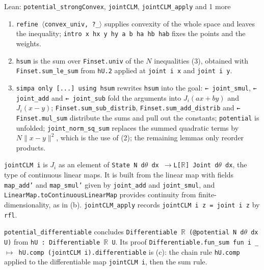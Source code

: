 \documentclass[11pt,a4paper]{report}
\begin{document}
\begin{leanbox}{Lean: \texttt{potential\_\allowbreak{}strongConvex}, \texttt{jointCLM}, \texttt{jointCLM\_\allowbreak{}apply} and 1 more}
\begin{enumerate}


\item \texttt{refine \ensuremath{\langle}convex\_\allowbreak{}univ, ?\_\allowbreak{}\ensuremath{\rangle}} supplies convexity of the whole space and leaves the inequality; \texttt{intro x hx y hy a b ha hb hab} fixes the points and the weights.

\item \texttt{hsum} is the sum over \texttt{Finset.\allowbreak{}univ} of the \(N\) inequalities (3), obtained with \texttt{Finset.\allowbreak{}sum\_\allowbreak{}le\_\allowbreak{}sum} from \texttt{h\allowbreak{}U.\allowbreak{}2} applied at \texttt{joint i x} and \texttt{joint i y}.

\item \texttt{simpa only [.\allowbreak{}.\allowbreak{}.\allowbreak{}] using hsum} rewrites \texttt{hsum} into the goal: \texttt{← joint\_\allowbreak{}smul}, \texttt{← joint\_\allowbreak{}add} and \texttt{← joint\_\allowbreak{}sub} fold the arguments into \(J_i(ax+by)\) and \(J_i(x-y)\); \texttt{Finset.\allowbreak{}sum\_\allowbreak{}sub\_\allowbreak{}distrib}, \texttt{Finset.\allowbreak{}sum\_\allowbreak{}add\_\allowbreak{}distrib} and \texttt{← Finset.\allowbreak{}mul\_\allowbreak{}sum} distribute the sums and pull out the constants; \texttt{potential} is unfolded; \texttt{joint\_\allowbreak{}norm\_\allowbreak{}sq\_\allowbreak{}sum} replaces the summed quadratic terms by \(N\|x-y\|^2\), which is the use of (2); the remaining lemmas only reorder products.

\end{enumerate}



\texttt{joint\allowbreak{}CLM i} is \(J_i\) as an element of \texttt{State N d\ensuremath{\theta} dx \ensuremath{\to}L[\ensuremath{\mathbb R}] Joint d\ensuremath{\theta} dx}, the type of continuous linear maps. It is built from the linear map with fields \texttt{map\_\allowbreak{}add'} and \texttt{map\_\allowbreak{}smul'} given by \texttt{joint\_\allowbreak{}add} and \texttt{joint\_\allowbreak{}smul}, and \texttt{Linear\allowbreak{}Map.\allowbreak{}to\allowbreak{}Continuous\allowbreak{}Linear\allowbreak{}Map} provides continuity from finite-dimensionality, as in (b). \texttt{joint\allowbreak{}CLM\_\allowbreak{}apply} records \texttt{joint\allowbreak{}CLM i z = joint i z} by \texttt{rfl}.




\texttt{potential\_\allowbreak{}differentiable} concludes \texttt{Differentiable \ensuremath{\mathbb R} (@potential N d\ensuremath{\theta} dx U)} from \texttt{h\allowbreak{}U : Differentiable \ensuremath{\mathbb R} U}. Its proof \texttt{Differentiable.\allowbreak{}fun\_\allowbreak{}sum fun i \_\allowbreak{} \ensuremath{\mapsto} h\allowbreak{}U.\allowbreak{}comp (joint\allowbreak{}CLM i).\allowbreak{}differentiable} is (c): the chain rule \texttt{h\allowbreak{}U.\allowbreak{}comp} applied to the differentiable map \texttt{joint\allowbreak{}CLM i}, then the sum rule.
\end{leanbox}
\end{document}
